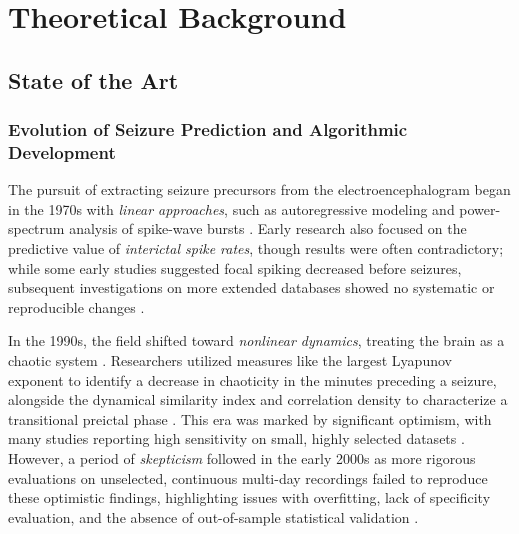 \chapter{Theoretical Background}\label{ch:theoretical-background}

\section{State of the Art}

\subsection{Evolution of Seizure Prediction and Algorithmic Development}

The pursuit of extracting seizure precursors from the electroencephalogram began in the 1970s with \textit{linear approaches}, such as autoregressive modeling and power-spectrum analysis of spike-wave bursts \parencite{mormann_seizure_2007}.
Early research also focused on the predictive value of \textit{interictal spike rates}, though results were often contradictory; while some early studies suggested focal spiking decreased before seizures, subsequent investigations on more extended databases showed no systematic or reproducible changes \parencite{mormann_seizure_2007}.

In the 1990s, the field shifted toward \textit{nonlinear dynamics}, treating the brain as a chaotic system \parencite{mormann_seizure_2007, kuhlmann_epilepsyecosystemorg_2018}.
Researchers utilized measures like the largest Lyapunov exponent to identify a decrease in chaoticity in the minutes preceding a seizure, alongside the dynamical similarity index and correlation density to characterize a transitional preictal phase \parencite{mormann_seizure_2007}.
This era was marked by significant optimism, with many studies reporting high sensitivity on small, highly selected datasets \parencite{mormann_seizure_2007, muller_coherent_2022}.
However, a period of \textit{skepticism} followed in the early 2000s as more rigorous evaluations on unselected, continuous multi-day recordings failed to reproduce these optimistic findings, highlighting issues with overfitting, lack of specificity evaluation, and the absence of out-of-sample statistical validation \parencite{mormann_seizure_2007, freestone_forward-looking_2017}.

